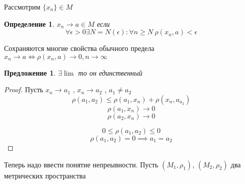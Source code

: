 \documentclass[14pt]{extarticle}
\newtheorem{definition}{Определение}
\newtheorem{pred}{Предложение}[section]
\begin{document}
Рассмотрим $\{x_{n}\} \in M$
\begin{definition}
	$x_{n} \to a \in M$  если 
	\begin{equation}
	\forall  \epsilon >  0 \exists  N = N(\epsilon) : \forall   n \ge  N~\rho(x_{n},a) < \epsilon
	\end{equation} 
\end{definition}
Сохраняются многие свойства обычного
предела $x_{n} \to a \iff \rho(x_{n},a) \to 0 ,n \to \infty$
\begin{pred}
	$\exists  \lim$ то он единственный
\end{pred}
\begin{proof}
	Пусть $x_{n} \to a_1$ , $x_{n} \to a_2$ , $a_1 \neq a_2$
	\begin{equation}
	\rho(a_1,a_2) \le \rho(a_1,x_{n} ) + \rho(x_{n},a_{a_2})
	\end{equation} 
	\begin{equation}
	\rho(a_1,x_{n}) \to 0
	\end{equation} 
	\begin{equation}
	\rho(a_2,x_{n}) \to 0
	\end{equation} 

\begin{equation}
0 \le  \rho(a_1,a_2) \le  0
\end{equation} 
\begin{equation}
\rho(a_1,a_2) = 0 \implies a_1 = a_2
\end{equation} 
\end{proof}
Теперь надо ввести понятие непреывности. 
Пусть $(M_1,\rho_1)$, $(M_2,\rho_2)$ два метрических пространства
\end{document}
